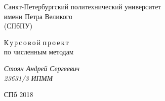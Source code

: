 \documentclass[a4paper,12pt]{article}
\author{Стоян А.С.}
\title{}
\date{\today}
\begin{document}

\thispagestyle{empty}
\begin{center}
    Санкт-Петербургский политехнический университет \\ имени Петра Великого \\ (СПбПУ)
\end{center}
\vspace{13ex}

\begin{center}
    \vspace{16ex}
    {\Large {К\,у\,р\,с\,о\,в\,о\,й\,\,п\,р\,о\,е\,к\,т}} \\
    по численным методам
\end{center}
\vfill
\begin{flushright}
    \noindent
    \textit{Стоян Андрей Сергеевич \\
        23631/3 ИПММ}
\end{flushright}
\begin{center}
    СПб 2018
\end{center}
\newpage

\tableofcontents
\newpage

%
%
%
\end{document}
